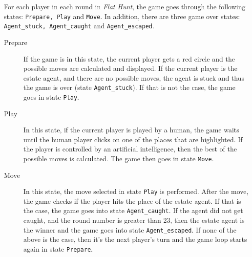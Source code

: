 For each player in each round in \emph{Flat Hunt}, the game goes through the following states: \texttt{Prepare, Play} and \texttt{Move}. In addition, there are three game over states: \texttt{Agent\_stuck, Agent\_caught} and \texttt{Agent\_escaped}.

\begin{description}
    
  \item[Prepare] If the game is in this state, the current player gets a red circle and the possible moves are calculated and displayed. If the current player is the estate agent, and there are no possible moves, the agent is stuck and thus the game is over (state \texttt{Agent\_stuck}). If that is not the case, the game goes in state \texttt{Play}.
  
  \item[Play] In this state, if the current player is played by a human, the game waits until the human player clicks on one of the places that are highlighted. If the player is controlled by an artificial intelligence, then the best of the possible moves is calculated. The game then goes in state \texttt{Move}.
  
  \item[Move] In this state, the move selected in state \texttt{Play} is performed. After the move, the game checks if the player hits the place of the estate agent. If that is the case, the game goes into state \texttt{Agent\_caught}. If the agent did not get caught, and the round number is greater than 23, then the estate agent is the winner and the game goes into state \texttt{Agent\_escaped}. If none of the above is the case, then it's the next player's turn and the game loop starts again in state \texttt{Prepare}.

\end{description}
